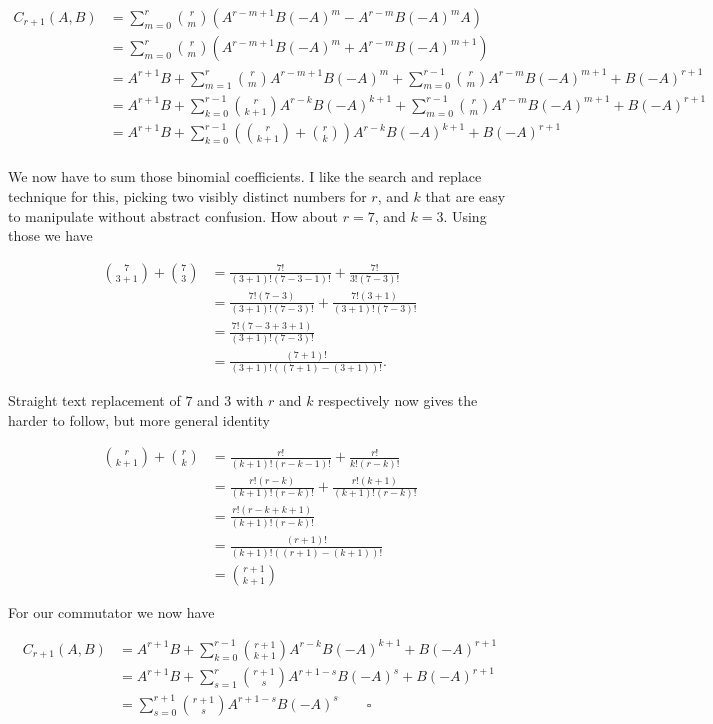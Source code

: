 \begin{align*}
C_{r+1}(A,B) 
&= \sum_{m=0}^r \binom{r}{m} 
\left( A^{r-m+1} B (-A)^m
-A^{r-m} B (-A)^{m} A \right) \\
&= \sum_{m=0}^r \binom{r}{m} 
\left( A^{r-m+1} B (-A)^m
+A^{r-m} B (-A)^{m+1} \right) \\
&= 
A^{r+1} B
+ \sum_{m=1}^r \binom{r}{m} 
A^{r-m+1} B (-A)^m
+ \sum_{m=0}^{r-1} \binom{r}{m} 
A^{r-m} B (-A)^{m+1} 
+ B (-A)^{r+1} \\
&= 
A^{r+1} B
+ \sum_{k=0}^{r-1} \binom{r}{k+1} 
A^{r-k} B (-A)^{k+1}
+ \sum_{m=0}^{r-1} \binom{r}{m} 
A^{r-m} B (-A)^{m+1} 
+ B (-A)^{r+1} \\
&= 
A^{r+1} B
+ \sum_{k=0}^{r-1} \left( \binom{r}{k+1} + \binom{r}{k} \right) A^{r-k} B (-A)^{k+1}
+ B (-A)^{r+1} \\
\end{align*}

We now have to sum those binomial coefficients.  I like the search and replace technique for this, picking two visibly distinct numbers for $r$, and $k$ that are easy to manipulate without abstract confusion.  How about $r=7$, and $k=3$.  Using those we have

\begin{align*}
\binom{7}{3+1} + \binom{7}{3} 
&=
\frac{7!}{(3+1)!(7-3-1)!}
+\frac{7!}{3!(7-3)!} \\
&=
\frac{7!(7-3)}{(3+1)!(7-3)!}
+\frac{7!(3+1)}{(3+1)!(7-3)!} \\
&=
\frac{7! \left( 7-3 + 3 + 1 \right) }{(3+1)!(7-3)!} \\
&=
\frac{(7+1)! }{(3+1)!((7+1)-(3+1))!}.
\end{align*}

Straight text replacement of $7$ and $3$ with $r$ and $k$ respectively now gives the harder to follow, but more general identity

\begin{align*}
\binom{r}{k+1} + \binom{r}{k} 
&=
\frac{r!}{(k+1)!(r-k-1)!}
+\frac{r!}{k!(r-k)!} \\
&=
\frac{r!(r-k)}{(k+1)!(r-k)!}
+\frac{r!(k+1)}{(k+1)!(r-k)!} \\
&=
\frac{r! \left( r-k + k + 1 \right) }{(k+1)!(r-k)!} \\
&=
\frac{(r+1)! }{(k+1)!((r+1)-(k+1))!} \\
&=
\binom{r+1}{k+1}
\end{align*}

For our commutator we now have

\begin{align*}
C_{r+1}(A,B) 
&= 
A^{r+1} B
+ \sum_{k=0}^{r-1} \binom{r+1}{k+1} A^{r-k} B (-A)^{k+1} 
+ B (-A)^{r+1} \\
&= 
A^{r+1} B
+ \sum_{s=1}^{r} \binom{r+1}{s} A^{r+1-s} B (-A)^{s} 
+ B (-A)^{r+1} \\
&= \sum_{s=0}^{r+1} \binom{r+1}{s} A^{r+1-s} B (-A)^{s} 
\qquad\square
\end{align*}

